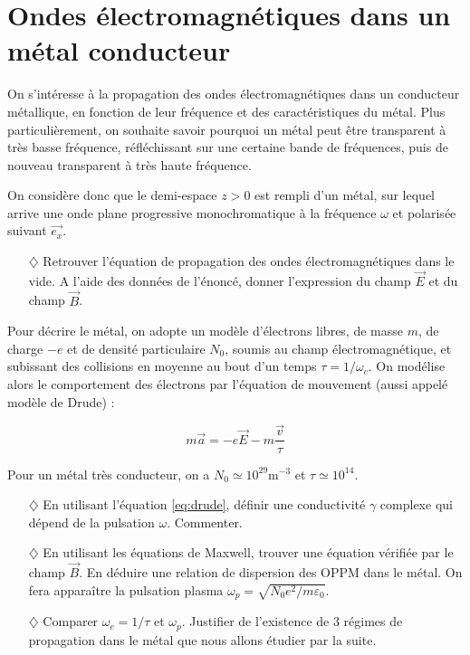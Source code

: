 \documentclass{report}
\begin{document}
\newpage

\section*{Ondes électromagnétiques dans un métal conducteur}

On s'intéresse à la propagation des ondes électromagnétiques dans un conducteur métallique, en fonction de leur fréquence et des caractéristiques du métal. Plus particulièrement, on souhaite savoir pourquoi un métal peut être transparent à très basse fréquence, réfléchissant sur une certaine bande de fréquences, puis de nouveau transparent à très haute fréquence.

On considère donc que le demi-espace $z>0$ est rempli d'un métal, sur lequel arrive une onde plane progressive monochromatique à la fréquence $\omega$ et polarisée suivant $\vec{e_x}$. 

\begin{itemize}

	\item[$\diamondsuit$] Retrouver l'équation de propagation des ondes électromagnétiques dans le vide. A l'aide des données de l'énoncé, donner l'expression du champ $\vec{E}$ et du champ $\vec{B}$.

\end{itemize}

Pour décrire le métal, on adopte un modèle d'électrons libres, de masse $m$, de charge $-e$ et de densité particulaire $N_0$, soumis au champ électromagnétique, et subissant des collisions en moyenne au bout d'un temps $\tau=1/\omega_c$. On modélise alors le comportement des électrons par l'équation de mouvement (aussi appelé modèle de Drude) :

\begin{equation}
	m\vec{a}=-e\vec{E}-m\frac{\vec{v}}{\tau}
	\label{eq:drude}
\end{equation}

Pour un métal très conducteur, on a $N_0\simeq10^{29}$m$^{-3}$ et $\tau\simeq10^{14}$.

\begin{itemize}

	\item[$\diamondsuit$] En utilisant l'équation \ref{eq:drude}, définir une conductivité $\gamma$ complexe qui dépend de la pulsation $\omega$. Commenter. 
	
	\item[$\diamondsuit$] En utilisant les équations de Maxwell, trouver une équation vérifiée par le champ $\vec{B}$. En déduire une relation de dispersion des OPPM dans le métal. On fera apparaître la pulsation plasma $\omega_p=\sqrt{N_0e^2/m\varepsilon_0}$.
	
	\item[$\diamondsuit$] Comparer $\omega_c=1/\tau$ et $\omega_p$. Justifier de l'existence de 3 régimes de propagation dans le métal que nous allons étudier par la suite.

\end{itemize}
\end{document}
